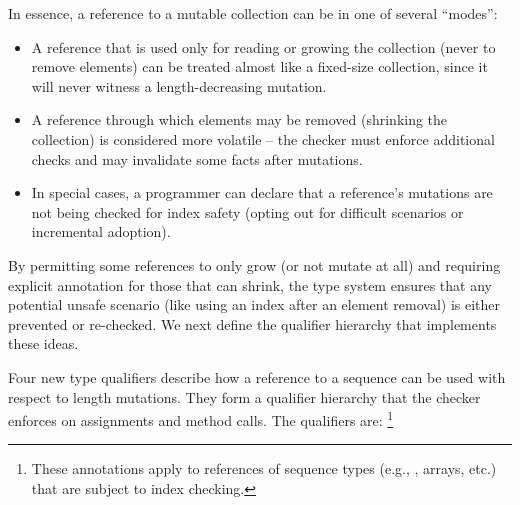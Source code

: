 In essence, a reference to a mutable collection can be in one of several “modes”:
\begin{itemize}
\item
  A reference that is used only for reading or growing the collection
  (never to remove elements) can be treated almost like a fixed-size collection,
  since it will never witness a length-decreasing mutation.
\item
  A reference through which elements may be removed (shrinking the collection)
  is considered more volatile – the checker must enforce additional checks and
  may invalidate some facts after mutations.
\item
  In special cases, a programmer can declare that a reference’s mutations are not
  being checked for index safety (opting out for difficult scenarios or incremental
  adoption).
\end{itemize}

By permitting some references to only grow (or not mutate at all) and requiring
explicit annotation for those that can shrink, the type system ensures that any
potential unsafe scenario (like using an index after an element removal) is either
prevented or re-checked. We next define the qualifier hierarchy that implements
these ideas.


Four new type qualifiers describe how a reference to a sequence can be used with
respect to length mutations. They form a qualifier hierarchy that the checker
enforces on assignments and method calls. The qualifiers are:
\footnote{These annotations apply to references of sequence types
(e.g., , arrays, etc.) that are subject to index checking.}

